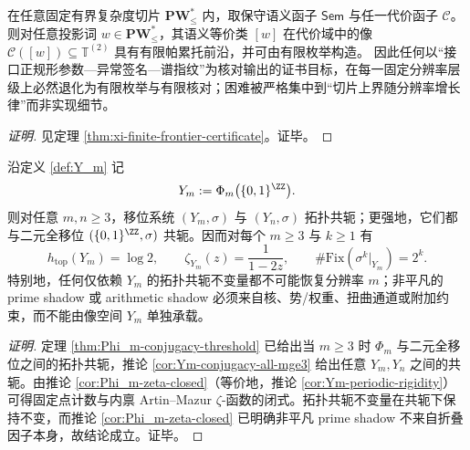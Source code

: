 \begin{conclusion}\label{con:xi-terminal-finite-frontier-principle}
在任意固定有界复杂度切片 \(\mathbf{PW}^{\ast}_{\le}\) 内，取保守语义函子 \(\mathsf{Sem}\) 与任一代价函子 \(\mathcal{C}\)。
则对任意投影词 \(w\in \mathbf{PW}^{\ast}_{\le}\)，其语义等价类 \([w]\) 在代价域中的像 \(\mathcal{C}([w])\subseteq \mathbb{T}^{(2)}\) 具有有限帕累托前沿，并可由有限枚举构造。
因此任何以“接口正规形参数—异常签名—谱指纹”为核对输出的证书目标，在每一固定分辨率层级上必然退化为有限枚举与有限核对；困难被严格集中到“切片上界随分辨率增长律”而非实现细节。
\end{conclusion}
\begin{proof}[证明]
见定理 \ref{thm:xi-finite-frontier-certificate}。证毕。
\end{proof}

\begin{conclusion}[像空间在 \texorpdfstring{$m\ge 3$}{m>=3} 时失去分辨率可辨识性：\texorpdfstring{$Y_m$}{Ym} 的共轭塌缩]\label{con:xi-terminal-image-space-resolution-nonidentifiability}
沿定义 \ref{def:Y_m} 记
\[
Y_m:=\Phi_m\bigl(\{0,1\}^{\ZZ}\bigr).
\]
则对任意 \(m,n\ge 3\)，移位系统 \((Y_m,\sigma)\) 与 \((Y_n,\sigma)\) 拓扑共轭；更强地，它们都与二元全移位 \((\{0,1\}^{\ZZ},\sigma)\) 共轭。因而对每个 \(m\ge 3\) 与 \(k\ge 1\) 有
\[
h_{\mathrm{top}}(Y_m)=\log 2,\qquad
\zeta_{Y_m}(z)=\frac{1}{1-2z},\qquad
\#\mathrm{Fix}(\sigma^k|_{Y_m})=2^k.
\]
特别地，任何仅依赖 \(Y_m\) 的拓扑共轭不变量都不可能恢复分辨率 \(m\)；非平凡的 prime shadow 或 arithmetic shadow 必须来自核、势/权重、扭曲通道或附加约束，而不能由像空间 \(Y_m\) 单独承载。
\end{conclusion}
\begin{proof}[证明]
定理 \ref{thm:Phi_m-conjugacy-threshold} 已给出当 \(m\ge 3\) 时 \(\Phi_m\) 与二元全移位之间的拓扑共轭，推论 \ref{cor:Ym-conjugacy-all-mge3} 给出任意 \(Y_m,Y_n\) 之间的共轭。由推论 \ref{cor:Phi_m-zeta-closed}（等价地，推论 \ref{cor:Ym-periodic-rigidity}）可得固定点计数与内禀 Artin--Mazur \(\zeta\)-函数的闭式。拓扑共轭不变量在共轭下保持不变，而推论 \ref{cor:Phi_m-zeta-closed} 已明确非平凡 prime shadow 不来自折叠因子本身，故结论成立。证毕。
\end{proof}

